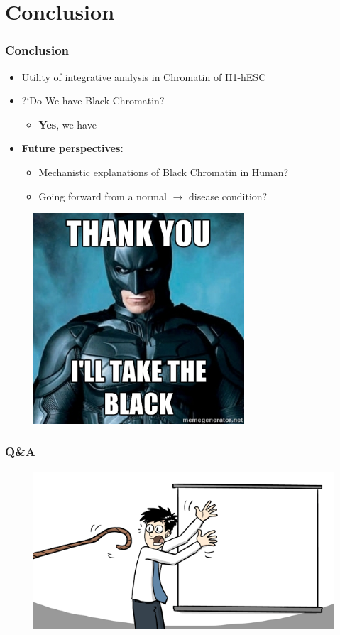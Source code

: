 \documentclass{beamer}
\begin{document}
\section{Conclusion}
\begin{frame}
	\frametitle{Conclusion}
	\begin{itemize}[<+->]
   	 	  \item Utility of integrative analysis in Chromatin of H1-hESC
		  \item ?`Do We have Black Chromatin?
		  \begin{itemize}
          	\item \textbf{Yes}, we have
		  \end{itemize}
          \item \textbf{Future perspectives:}
          \begin{itemize}[<+->]
          	\item Mechanistic explanations of Black Chromatin in Human?
          	\item Going forward from a normal $\rightarrow$ disease condition?
		  \end{itemize}
  	\end{itemize}
\end{frame}

\begin{frame}
	\begin{figure}
		\includegraphics[width=0.7\textwidth]{figs/BlackBatman}
	\end{figure}
\end{frame}

\begin{frame}
	\frametitle{Q\&A}
	\begin{figure}
		\includegraphics[width=1\textwidth]{figs/Q&A}
	\end{figure}
\end{frame}
\end{document}
